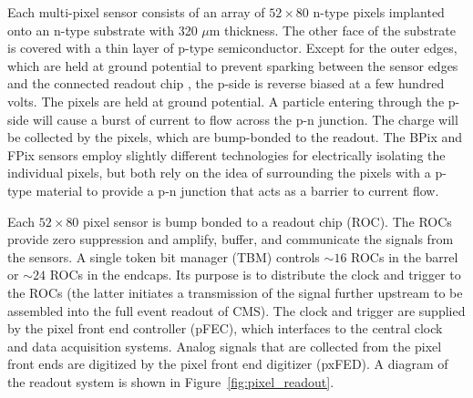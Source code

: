 \documentclass[dissertation.tex]{subfiles}
\begin{document}
Each multi-pixel sensor consists of an array of $52\times80$ n-type pixels implanted onto an n-type substrate with 320 $\mu\mbox{m}$ thickness.  The other face of the substrate is covered with a thin layer of p-type semiconductor.  Except for the outer edges, which are held at ground potential to prevent sparking between the sensor edges and the connected readout chip \cite{pixel_design_paper}, the p-side is reverse biased at a few hundred volts.  The pixels are held at ground potential.  A particle entering through the p-side will cause a burst of current to flow across the p-n junction.  The charge will be collected by the pixels, which are bump-bonded to the readout.  The BPix and FPix sensors employ slightly different technologies for electrically isolating the individual pixels, but both rely on the idea of surrounding the pixels with a p-type material to provide a p-n junction that acts as a barrier to current flow.

Each $52\times80$ pixel sensor is bump bonded to a readout chip (ROC).  The ROCs provide zero suppression and amplify,  buffer, and communicate the signals from the sensors.  A single token bit manager (TBM) controls $\sim16$ ROCs in the barrel or $\sim24$ ROCs in the endcaps.  Its purpose is to distribute the clock and trigger to the ROCs (the latter initiates a transmission of the signal further upstream to be assembled into the full event readout of CMS).  The clock and trigger are supplied by the pixel front end controller (pFEC), which interfaces to the central clock and data acquisition systems.  Analog signals that are collected from the pixel front ends are digitized by the pixel front end digitizer (pxFED).  A diagram of the readout system is shown in Figure~\ref{fig:pixel_readout}.
\end{document}
